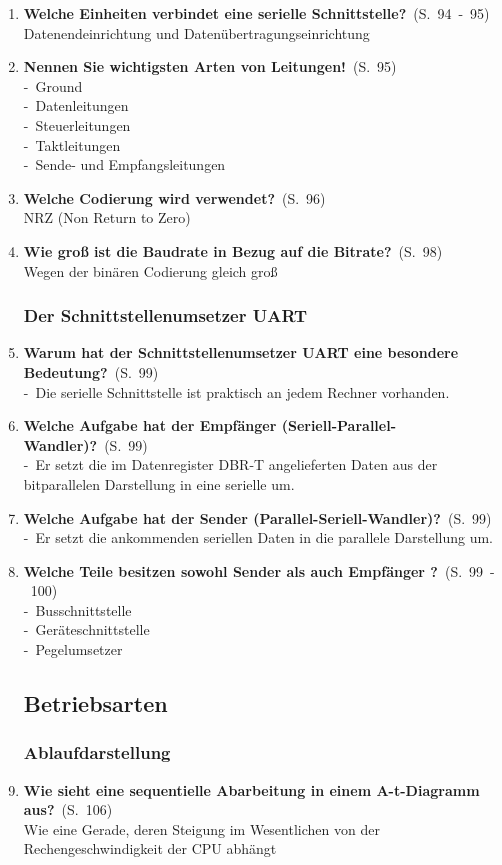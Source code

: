 \documentclass[a4paper,12pt]{article}
\newcommand{\question}[3]{\pagebreak[3]\item {\textbf{#1?}}\ (S.\ #2)#3}
\newcommand{\statement}[3]{\pagebreak[3]\item {\textbf{#1!}}\ (S.\ #2)#3}
\newcommand{\catchword}[1]{\\-\ #1}
\newcommand{\normaltext}[1]{\\#1}
\newcommand{\page}[1]{#1}
\newcommand{\pages}[2]{#1\ -\ #2}
\begin{document}
\begin{enumerate}
  \question{Welche Einheiten verbindet eine serielle Schnittstelle}{\pages{94}{95}}
  {
    \normaltext{Datenendeinrichtung und Datenübertragungseinrichtung}
  }

  \statement{Nennen Sie wichtigsten Arten von Leitungen}{\page{95}}
  {
    \catchword{Ground}
    \catchword{Datenleitungen}
    \catchword{Steuerleitungen}
    \catchword{Taktleitungen}
    \catchword{Sende- und Empfangsleitungen}
  }

  \question{Welche Codierung wird verwendet}{\page{96}}
  {
    \normaltext{NRZ (Non Return to Zero)}
  }

  \question{Wie groß ist die Baudrate in Bezug auf die Bitrate}{\page{98}}
  {
    \normaltext{Wegen der binären Codierung gleich groß}
  }

  \subsubsection{Der Schnittstellenumsetzer UART}

  \question{Warum hat der Schnittstellenumsetzer UART eine besondere Bedeutung}{\page{99}}
  {
    \catchword{Die serielle Schnittstelle ist praktisch an jedem Rechner vorhanden.}
  }

    \question{Welche Aufgabe hat der Empfänger (Seriell-Parallel-Wandler)}{\page{99}}
  {
    \catchword{Er setzt die im Datenregister DBR-T angelieferten Daten aus der bitparallelen 
               Darstellung in eine serielle um.}
  }

  \question{Welche Aufgabe hat der Sender (Parallel-Seriell-Wandler)}{\page{99}}
  {
    \catchword{Er setzt die ankommenden seriellen Daten in die parallele Darstellung um.}
  }

  \question{Welche Teile besitzen sowohl Sender als auch Empfänger }{\pages{99}{100}}
  {
    \catchword{Busschnittstelle}
    \catchword{Geräteschnittstelle}
    \catchword{Pegelumsetzer}
  }

  \subsection{Betriebsarten}

  \subsubsection{Ablaufdarstellung}

  \question{Wie sieht eine sequentielle Abarbeitung in einem A-t-Diagramm aus}{\page{106}}
  {
    \normaltext{Wie eine Gerade, deren Steigung im Wesentlichen von der Rechengeschwindigkeit
                der CPU abhängt}
  }


\end{enumerate}
\end{document}

